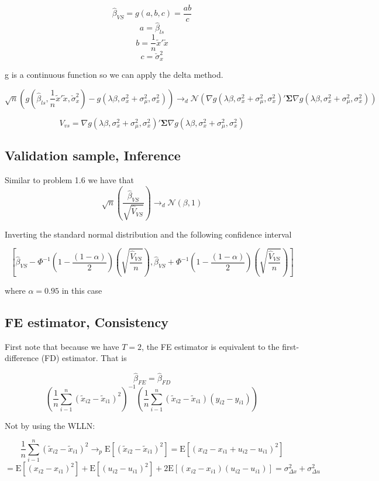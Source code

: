 \documentclass[11pt]{article}
\newcommand{\plim}{\rightarrow_{p}}
\newcommand{\E}{\mathrm{E}}
\begin{document}
$$\hat{\beta}_{VS} = g(a,b,c) = \frac{ab}{c} $$
$$ a = \hat{\beta}_{ls} $$
$$ b = \frac{1}{n}\tilde{x}'\tilde{x} $$
$$ c = \check{\sigma}_x^2 $$

g is a continuous function so we can apply the delta method. 

$$ \sqrt{n} \left( g \left( \hat{\beta}_{ls}, \frac{1}{n}\tilde{x}'\tilde{x}, \check{\sigma}_x^2 \right) - g \left( \lambda \beta, \sigma_x^2 + \sigma_{\mu}^2, \sigma_x^2 \right) \right) \to_d 
\mathcal{N} \left( \nabla g \left( \lambda \beta, \sigma_x^2 + \sigma_{\mu}^2, \sigma_x^2 \right)' 
\bm{\Sigma} 
\nabla g \left( \lambda \beta, \sigma_x^2 + \sigma_{\mu}^2, \sigma_x^2 \right) \right) $$

$$ V_{vs} =  \nabla g \left( \lambda \beta, \sigma_x^2 + \sigma_{\mu}^2, \sigma_x^2 \right)' 
\bm{\Sigma} 
\nabla g \left( \lambda \beta, \sigma_x^2 + \sigma_{\mu}^2, \sigma_x^2 \right) $$

\subsection{Validation sample, Inference}

Similar to problem 1.6 we have that 
$$
\sqrt{n} \left( \frac{\hat{\beta}_{VS}}{\sqrt{\hat{V}_{VS} }} \right) \to_d \mathcal{N}(\beta,1)
$$


Inverting the standard normal distribution and the following confidence interval 

$$ \left[ \hat{\beta}_{VS} - \Phi^{-1} \left( 1 -\frac{(1-\alpha)}{2} \right) \left( \sqrt{\frac{\hat{V}_{VS} }{n}} \right),  \hat{\beta}_{VS} + \Phi^{-1} \left( 1 -\frac{(1-\alpha)}{2} \right) \left( \sqrt{\frac{\hat{V}_{VS} }{n}} \right) \right] $$

where $\alpha = 0.95$ in this case 

\subsection{FE estimator, Consistency}
First note that because we have $T=2$, the FE estimator is equivalent to the first-difference (FD) estimator. That is 


$$\hat{\beta}_{FE} = \hat{\beta}_{FD} $$
$$ \left( \frac{1}{n} \sum_{i-1}^{n}(\tilde{x}_{i2} - \tilde{x}_{i1} )^2 \right)^{-1} 
 \left( \frac{1}{n} \sum_{i-1}^{n}(\tilde{x}_{i2} - \tilde{x}_{i1} )(y_{i2}-y_{i1}) \right)$$
 
 Not by using the WLLN:
 
 $$ \frac{1}{n} \sum_{i-1}^{n}(\tilde{x}_{i2} - \tilde{x}_{i1} )^2 \plim \E[(\tilde{x}_{i2} - \tilde{x}_{i1} )^2]
  = \E[(x_{i2} - x_{i1} + u_{i2} - u_{i1})^2]$$
  $$ =  \E[(x_{i2} - x_{i1})^2] +\E[(u_{i2} - u_{i1})^2] +2\E[(x_{i2} - x_{i1})(u_{i2}-u_{i1})] = \sigma_{\Delta x}^2 + \sigma_{\Delta u}^2
  $$
  
\end{document}

